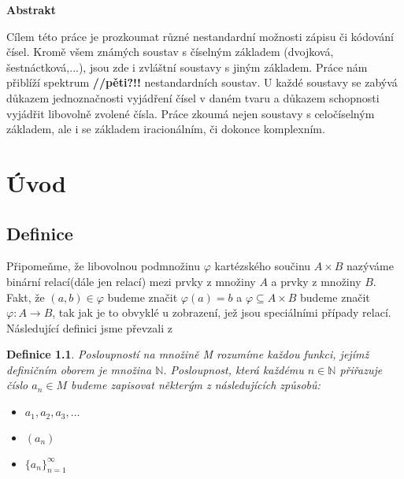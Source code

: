 \documentclass[12pt]{book}
\newtheorem{definice}{Definice}
\begin{document}
\newpage

\textbf{Abstrakt}

Cílem této práce je prozkoumat různé nestandardní možnosti zápisu či kódování čísel. Kromě všem známých soustav s číselným základem (dvojková, šestnáctková,...), jsou zde i zvláštní soustavy s jiným základem. Práce nám přiblíží spektrum \textbf{//pěti?!!} nestandardních soustav. U každé soustavy se zabývá důkazem jednoznačnosti vyjádření čísel v daném tvaru a důkazem schopnosti vyjádřit libovolně zvolené čísla. Práce zkoumá nejen soustavy s celočíselným základem, ale i se základem iracionálním, či dokonce komplexním.

\newpage

\tableofcontents

\newpage

\chapter{Úvod}
\section{Definice}

\newcommand{\poslbeta}{\{\beta_i\}_{i=1}^{\infty}}
\newcommand{\poslalpha}{\{\alpha_i\}_{i=0}^{\infty}}
\newcommand{\posla}{\{a_i\}_{i=0}^{\infty}}
\newcommand{\poslb}{\{b_i\}_{i=1}^{\infty}}

Připomeňme, že libovolnou podmnožinu $\varphi$ kartézského součinu $A \times B$ nazýváme binární relací(dále jen relací) mezi prvky z množiny $A$ a prvky z množiny $B$. Fakt, že $(a,b)\in \varphi$ budeme značit $\varphi(a) = b$ a $\varphi \subseteq A \times B$ budeme značit $\varphi : A \rightarrow B$, tak jak je to obvyklé u zobrazení, jež jsou speciálními případy relací.\newline\newline
Následující definici jsme převzali z \cite{aa}
\begin{definice}
	Posloupností na množině M rozumíme každou funkci, jejímž definičním oborem je množina $\mathbb{N}$. Posloupnost, která každému $n \in \mathbb{N}$ přiřazuje číslo $a_n \in M$ budeme zapisovat některým z následujících způsobů:
	\begin{itemize}
		\item $a_1, a_2, a_3,\dots$
		\item $(a_n)$
		\item $\{a_n\}_{n=1}^{\infty}$
	\end{itemize}
\end{definice}
\end{document}
